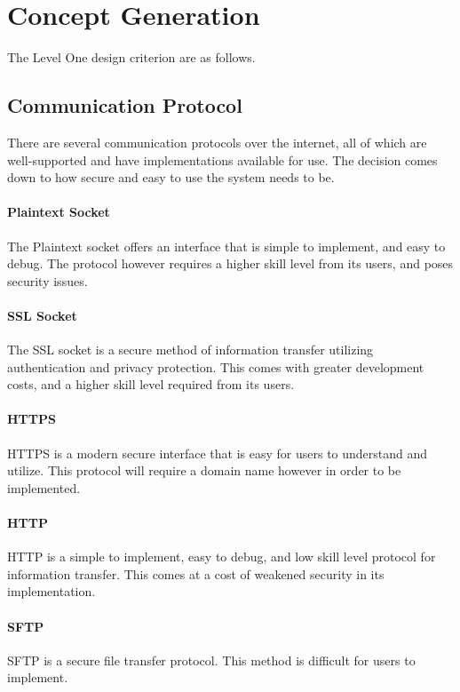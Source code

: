 
\section{Concept Generation}
The Level One design criterion are as follows.

\subsection{Communication Protocol}
There are several communication protocols over the internet, all of which are well-supported and have implementations available for use. 
The decision comes down to how secure and easy to use the system needs to be.

\paragraph{Plaintext Socket} 
The Plaintext socket offers an interface that is simple to implement, and easy to debug.
The protocol however requires a higher skill level from its users, and poses security issues.

\paragraph{SSL Socket} 
The SSL socket is a secure method of information transfer utilizing authentication and privacy protection.
This comes with greater development costs, and a higher skill level required from its users. 

\paragraph{HTTPS} 
HTTPS is a modern secure interface that is easy for users to understand and utilize.
This protocol will require a domain name however in order to be implemented.

\paragraph{HTTP}
HTTP is a simple to implement, easy to debug, and low skill level protocol for information transfer.
This comes at a cost of weakened security in its implementation.

\paragraph{SFTP}
SFTP is a secure file transfer protocol.
This method is difficult for users to implement.

